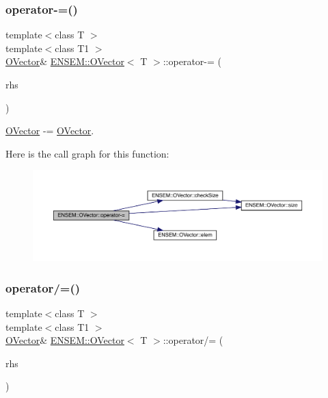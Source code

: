 \subsubsection{\texorpdfstring{operator-\/=()}{operator-=()}\hspace{0.1cm}{\footnotesize\ttfamily [6/6]}}
{\footnotesize\ttfamily template$<$class T $>$ \\
template$<$class T1 $>$ \\
\mbox{\hyperlink{classENSEM_1_1OVector}{O\+Vector}}\& \mbox{\hyperlink{classENSEM_1_1OVector}{E\+N\+S\+E\+M\+::\+O\+Vector}}$<$ T $>$\+::operator-\/= (\begin{DoxyParamCaption}\item[{const \mbox{\hyperlink{classENSEM_1_1OVector}{O\+Vector}}$<$ T1 $>$ \&}]{rhs }\end{DoxyParamCaption})\hspace{0.3cm}{\ttfamily [inline]}}



\mbox{\hyperlink{classENSEM_1_1OVector}{O\+Vector}} -\/= \mbox{\hyperlink{classENSEM_1_1OVector}{O\+Vector}}. 

Here is the call graph for this function\+:
\nopagebreak
\begin{figure}[H]
\begin{center}
\leavevmode
\includegraphics[width=350pt]{d0/d8d/classENSEM_1_1OVector_ae8a6c2f30368c6713325d05065aec425_cgraph}
\end{center}
\end{figure}
\mbox{\label{classENSEM_1_1OVector_aa26be39a0620d0cdc1685bc2f1cc31a5}} 
\subsubsection{\texorpdfstring{operator/=()}{operator/=()}\hspace{0.1cm}{\footnotesize\ttfamily [1/6]}}
{\footnotesize\ttfamily template$<$class T $>$ \\
template$<$class T1 $>$ \\
\mbox{\hyperlink{classENSEM_1_1OVector}{O\+Vector}}\& \mbox{\hyperlink{classENSEM_1_1OVector}{E\+N\+S\+E\+M\+::\+O\+Vector}}$<$ T $>$\+::operator/= (\begin{DoxyParamCaption}\item[{const \mbox{\hyperlink{classENSEM_1_1OScalar}{O\+Scalar}}$<$ T1 $>$ \&}]{rhs }\end{DoxyParamCaption})\hspace{0.3cm}{\ttfamily [inline]}}



